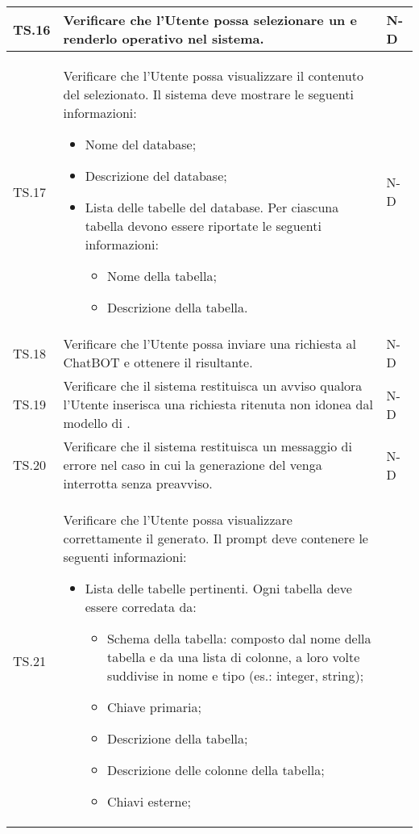\begin{adjustwidth}{-0.5cm}{-0.5cm}
\begin{longtable}{|P{1.5cm}|>{\raggedright}P{9.5cm}|>{\arraybackslash}P{1.5cm}|}
		\hline TS.16 & Verificare che l'Utente possa selezionare un  e renderlo operativo nel sistema. & N-D \\ 
		\hline TS.17 & Verificare che l'Utente possa visualizzare il contenuto del  selezionato. Il sistema deve mostrare le seguenti informazioni:
		\begin{itemize}
			\item Nome del database;
			\item Descrizione del database;
			\item Lista delle tabelle del database. Per ciascuna tabella devono essere riportate le seguenti informazioni:
				\begin{itemize}
					\item Nome della tabella;
					\item Descrizione della tabella.
				\end{itemize}
		\end{itemize} & N-D \\  
		\hline TS.18 & Verificare che l'Utente possa inviare una richiesta al ChatBOT e ottenere il  risultante. & N-D \\ 
		\hline TS.19 & Verificare che il sistema restituisca un avviso qualora l'Utente inserisca una richiesta ritenuta non idonea dal modello di . & N-D \\
		\hline TS.20 & Verificare che il sistema restituisca un messaggio di errore nel caso in cui la generazione del  venga interrotta senza preavviso. & N-D \\ 
		\hline TS.21 & Verificare che l'Utente possa visualizzare correttamente il  generato. Il prompt deve contenere le seguenti informazioni:
		\begin{itemize}
			\item Lista delle tabelle pertinenti. Ogni tabella deve essere corredata da:
			\begin{itemize}
				\item Schema della tabella: composto dal nome della tabella e da una lista di colonne, a loro volte suddivise in nome e tipo (es.: integer, string);
				\item Chiave primaria;
				\item Descrizione della tabella;
				\item Descrizione delle colonne della tabella;
				\item Chiavi esterne;
			\end{itemize}

\end{itemize}
\end{longtable}
\end{adjustwidth}
